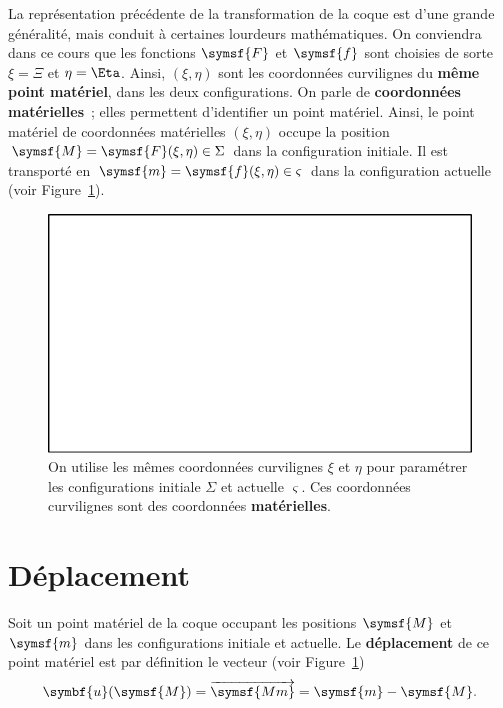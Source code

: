 \documentclass[
  a4paper,
  DIV=11,
  numbers=noendperiod]{scrreprt}
\newcommand{\altvec}[1]{\overrightarrow{#1}}
\newcommand{\point}[1]{\symsf{#1}}
\renewcommand{\vec}[1]{\symbf{#1}}
\begin{document}
La représentation précédente de la transformation de la coque est d'une
grande généralité, mais conduit à certaines lourdeurs mathématiques. On
conviendra dans ce cours que les fonctions \(\point{F}\) et
\(\point{f}\) sont choisies de sorte \(\xi = \Xi\) et \(\eta = \Eta\).
Ainsi, \((\xi, \eta)\) sont les coordonnées curvilignes du \textbf{même
point matériel}, dans les deux configurations. On parle de
\textbf{coordonnées matérielles}~; elles permettent d'identifier un
point matériel. Ainsi, le point matériel de coordonnées matérielles
\((\xi, \eta)\) occupe la position
\(\point{M} = \point{F}(\xi, \eta) \in \Sigma\) dans la configuration
initiale. Il est transporté en
\(\point{m} = \point{f}(\xi, \eta) \in \varsigma\) dans la configuration
actuelle (voir Figure~\ref{fig-20230302053622}).

\begin{figure}

{\centering \includegraphics{croquis/blanc.pdf}

}

\caption{\label{fig-20230302053622}On utilise les mêmes coordonnées
curvilignes \(\xi\) et \(\eta\) pour paramétrer les configurations
initiale \(\Sigma\) et actuelle \(\varsigma\). Ces coordonnées
curvilignes sont des coordonnées \textbf{matérielles}.}

\end{figure}

\hypertarget{duxe9placement}{%
\section{Déplacement}\label{duxe9placement}}

Soit un point matériel de la coque occupant les positions \(\point{M}\)
et \(\point{m}\) dans les configurations initiale et actuelle. Le
\textbf{déplacement} de ce point matériel est par définition le vecteur
(voir Figure~\ref{fig-20230302053622}) \[
\vec{u}(\point{M}) = \altvec{\point{Mm}} = \point{m} - \point{M}.
\]
\end{document}
